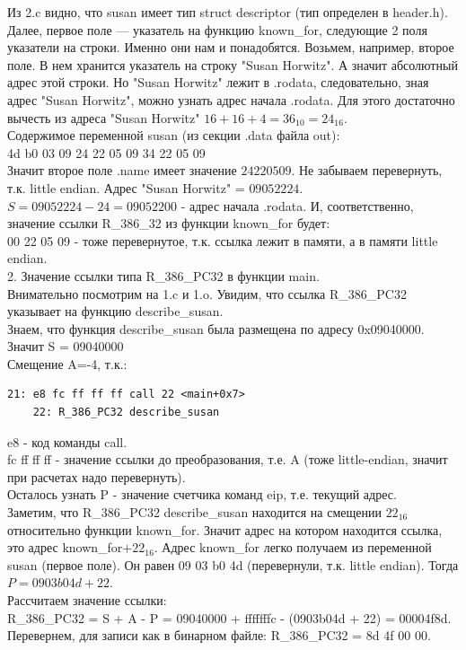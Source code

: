 \documentclass[12pt, letterpaper]{article}
\begin{document}
Из 2.c видно, что susan имеет тип struct descriptor (тип определен в header.h). Далее, первое поле — указатель на функцию known\_for, следующие 2 поля указатели на строки. Именно они нам и понадобятся. Возьмем, например, второе поле. В нем хранится указатель на строку "Susan Horwitz". А значит абсолютный адрес этой строки. Но "Susan Horwitz" лежит в .rodata, следовательно, зная адрес "Susan Horwitz", можно узнать адрес начала .rodata. Для этого достаточно вычесть из адреса "Susan Horwitz" $16+16+4=36_{10}=24_{16}$.\\
Содержимое переменной susan (из секции .data файла out):\\
4d b0 03 09 24 22 05 09 34 22 05 09\\
Значит второе поле .name имеет значение $24 22 05 09$. Не забываем перевернуть, т.к. little endian. Адрес "Susan Horwitz" = $09 05 22 24$.\\
$S = 09 05 22 24 - 24 = 09 05 22 00$ - адрес начала .rodata. И, соответственно, значение ссылки R\_386\_32 из функции known\_for будет:\\ 00 22 05 09 - тоже перевернутое, т.к. ссылка лежит в памяти, а в памяти little endian.\\

2. Значение ссылки типа R\_386\_PC32 в функции main.\\

Внимательно посмотрим на 1.c и 1.o. Увидим, что ссылка R\_386\_PC32 указывает на функцию describe\_susan.\\
Знаем, что функция describe\_susan была размещена по адресу 0x09040000. Значит S = 09040000\\
Смещение A=-4, т.к.:\\
\begin{verbatim}
21: e8 fc ff ff ff call 22 <main+0x7>
    22: R_386_PC32 describe_susan
\end{verbatim}
e8 - код команды call.\\ fc ff ff ff - значение ссылки до преобразования, т.е. A (тоже little-endian, значит при расчетах надо перевернуть).\\
Осталось узнать P - значение счетчика команд eip, т.е. текущий адрес.\\

Заметим, что R\_386\_PC32 describe\_susan находится на смещении $22_{16}$ относительно функции known\_for. Значит адрес на котором находится ссылка, это адрес known\_for$+22_{16}$. Адрес known\_for легко получаем из переменной susan (первое поле). Он равен 09 03 b0 4d (перевернули, т.к. little endian). Тогда $P=0903b04d+22$.\\
Рассчитаем значение ссылки:\\
R\_386\_PC32 = S + A - P = 09040000 + fffffffc - (0903b04d + 22) = 00004f8d.\\ Перевернем, для записи как в бинарном файле: R\_386\_PC32 = 8d 4f 00 00.\\
\end{document}
